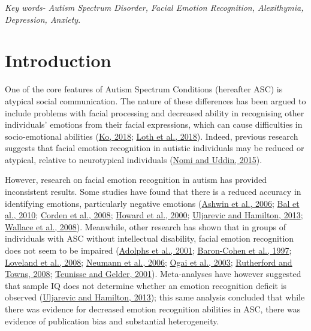 \documentclass[
]{article}
\begin{document}
\emph{Key words- Autism Spectrum Disorder, Facial Emotion Recognition, Alexithymia, Depression, Anxiety}.

\hypertarget{introduction}{%
\section*{Introduction}\label{introduction}}

One of the core features of Autism Spectrum Conditions (hereafter ASC) is atypical social communication. The nature of these differences has been argued to include problems with facial processing and decreased ability in recognising other individuals' emotions from their facial expressions, which can cause difficulties in socio-emotional abilities (\protect\hyperlink{ref-ko2018a}{Ko, 2018}; \protect\hyperlink{ref-loth2018a}{Loth et al., 2018}). Indeed, previous research suggests that facial emotion recognition in autistic individuals may be reduced or atypical, relative to neurotypical individuals (\protect\hyperlink{ref-nomi2015a}{Nomi and Uddin, 2015}).

However, research on facial emotion recognition in autism has provided inconsistent results. Some studies have found that there is a reduced accuracy in identifying emotions, particularly negative emotions (\protect\hyperlink{ref-ashwin2006a}{Ashwin et al., 2006}; \protect\hyperlink{ref-bal2010a}{Bal et al., 2010}; \protect\hyperlink{ref-corden2008a}{Corden et al., 2008}; \protect\hyperlink{ref-howard2000a}{Howard et al., 2000}; \protect\hyperlink{ref-uljarevic2013a}{Uljarevic and Hamilton, 2013}; \protect\hyperlink{ref-wallace2008a}{Wallace et al., 2008}). Meanwhile, other research has shown that in groups of individuals with ASC without intellectual disability, facial emotion recognition does not seem to be impaired (\protect\hyperlink{ref-adolphs2001a}{Adolphs et al., 2001}; \protect\hyperlink{ref-baron-cohen1997a}{Baron-Cohen et al., 1997}; \protect\hyperlink{ref-loveland2008a}{Loveland et al., 2008}; \protect\hyperlink{ref-neumann2006a}{Neumann et al., 2006}; \protect\hyperlink{ref-ogai2003a}{Ogai et al., 2003}; \protect\hyperlink{ref-rutherford2008a}{Rutherford and Towns, 2008}; \protect\hyperlink{ref-teunisse2001a}{Teunisse and Gelder, 2001}). Meta-analyses have however suggested that sample IQ does not determine whether an emotion recognition deficit is observed (\protect\hyperlink{ref-uljarevic2013a}{Uljarevic and Hamilton, 2013}); this same analysis concluded that while there was evidence for decreased emotion recognition abilities in ASC, there was evidence of publication bias and substantial heterogeneity.
\end{document}
